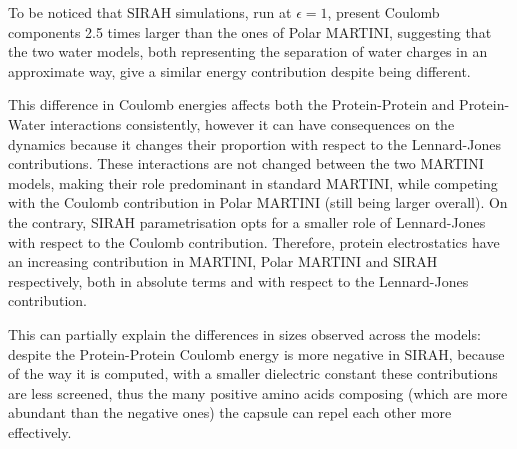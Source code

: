 To be noticed that SIRAH simulations, run at $\epsilon = 1$, present Coulomb components 2.5 times larger than the ones of Polar MARTINI, suggesting that the two water models, both representing the separation of water charges in an approximate way, give a similar energy contribution despite being different.

This difference in Coulomb energies affects both the Protein-Protein and Protein-Water interactions consistently, however it can have consequences on the dynamics because it changes their proportion with respect to the Lennard-Jones contributions. These interactions are not changed between the two MARTINI models, making their role predominant in standard MARTINI, while competing with the Coulomb contribution in Polar MARTINI (still being larger overall).
%
On the contrary, SIRAH parametrisation opts for a smaller role of Lennard-Jones with respect to the Coulomb contribution.
%
Therefore, protein electrostatics have an increasing contribution in MARTINI, Polar MARTINI and SIRAH respectively, both in absolute terms and with respect to the Lennard-Jones contribution.

This can partially explain the differences in sizes observed across the models: despite the Protein-Protein Coulomb energy is more negative in SIRAH, because of the way it is computed, with a smaller dielectric constant these contributions are less screened, thus the many positive amino acids composing (which are more abundant than the negative ones) the capsule can repel each other more effectively.

